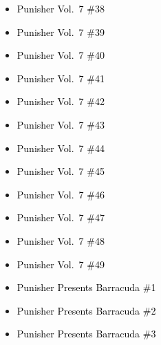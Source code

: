 \documentclass[12pt]{article}
\newcommand{\checkbox}{\raisebox{0.0ex}{\fbox{\rule{0ex}{1.5ex} \rule{1.5ex}{0ex}}}}
\begin{document}
\vspace{0.3cm}
\noindent
\begin{tcolorbox}[
  colback=white!95!gray,
  colframe=black,
  width=\textwidth,
  arc=4mm,
  auto outer arc,
  boxrule=0.8pt,
  left=8pt,right=8pt,top=8pt,bottom=8pt
]
\begin{itemize}[left=0pt,label={\checkbox}]
    \item \textcolor{black}{Punisher Vol.\ 7 \#38}
    \item \textcolor{black}{Punisher Vol.\ 7 \#39}
    \item \textcolor{black}{Punisher Vol.\ 7 \#40}
    \item \textcolor{black}{Punisher Vol.\ 7 \#41}
    \item \textcolor{black}{Punisher Vol.\ 7 \#42}
    \item \textcolor{black}{Punisher Vol.\ 7 \#43}
    \item \textcolor{black}{Punisher Vol.\ 7 \#44}
    \item \textcolor{black}{Punisher Vol.\ 7 \#45}
    \item \textcolor{black}{Punisher Vol.\ 7 \#46}
    \item \textcolor{black}{Punisher Vol.\ 7 \#47}
    \item \textcolor{black}{Punisher Vol.\ 7 \#48}
    \item \textcolor{black}{Punisher Vol.\ 7 \#49}
    \item \textcolor{black}{Punisher Presents Barracuda \#1}
    \item \textcolor{black}{Punisher Presents Barracuda \#2}
    \item \textcolor{black}{Punisher Presents Barracuda \#3}
\end{itemize}
\end{tcolorbox}

\newpage
{}
\end{document}
